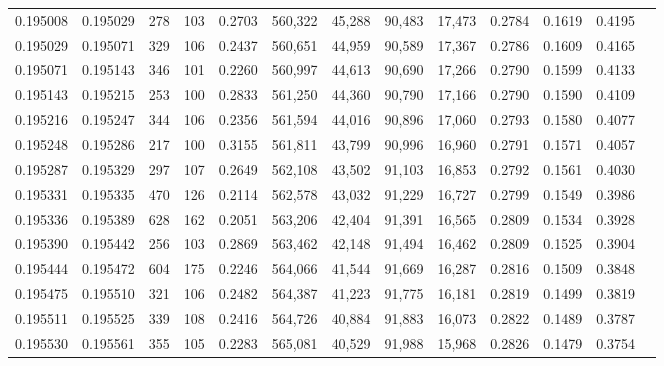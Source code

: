 \begin{tabular}{rrrrrrrrrrrrr}
0.195008 & 0.195029 &   278 & 103 &                                     0.2703 & 560,322 &  45,288 &  90,483 &  17,473 & 0.2784 & 0.1619 & 0.4195 \\
0.195029 & 0.195071 &   329 & 106 &                                     0.2437 & 560,651 &  44,959 &  90,589 &  17,367 & 0.2786 & 0.1609 & 0.4165 \\
0.195071 & 0.195143 &   346 & 101 &                                     0.2260 & 560,997 &  44,613 &  90,690 &  17,266 & 0.2790 & 0.1599 & 0.4133 \\
0.195143 & 0.195215 &   253 & 100 &                                     0.2833 & 561,250 &  44,360 &  90,790 &  17,166 & 0.2790 & 0.1590 & 0.4109 \\
0.195216 & 0.195247 &   344 & 106 &                                     0.2356 & 561,594 &  44,016 &  90,896 &  17,060 & 0.2793 & 0.1580 & 0.4077 \\
0.195248 & 0.195286 &   217 & 100 &                                     0.3155 & 561,811 &  43,799 &  90,996 &  16,960 & 0.2791 & 0.1571 & 0.4057 \\
0.195287 & 0.195329 &   297 & 107 &                                     0.2649 & 562,108 &  43,502 &  91,103 &  16,853 & 0.2792 & 0.1561 & 0.4030 \\
0.195331 & 0.195335 &   470 & 126 &                                     0.2114 & 562,578 &  43,032 &  91,229 &  16,727 & 0.2799 & 0.1549 & 0.3986 \\
0.195336 & 0.195389 &   628 & 162 &                                     0.2051 & 563,206 &  42,404 &  91,391 &  16,565 & 0.2809 & 0.1534 & 0.3928 \\
0.195390 & 0.195442 &   256 & 103 &                                     0.2869 & 563,462 &  42,148 &  91,494 &  16,462 & 0.2809 & 0.1525 & 0.3904 \\
0.195444 & 0.195472 &   604 & 175 &                                     0.2246 & 564,066 &  41,544 &  91,669 &  16,287 & 0.2816 & 0.1509 & 0.3848 \\
0.195475 & 0.195510 &   321 & 106 &                                     0.2482 & 564,387 &  41,223 &  91,775 &  16,181 & 0.2819 & 0.1499 & 0.3819 \\
0.195511 & 0.195525 &   339 & 108 &                                     0.2416 & 564,726 &  40,884 &  91,883 &  16,073 & 0.2822 & 0.1489 & 0.3787 \\
0.195530 & 0.195561 &   355 & 105 &                                     0.2283 & 565,081 &  40,529 &  91,988 &  15,968 & 0.2826 & 0.1479 & 0.3754 \\

\end{tabular}
